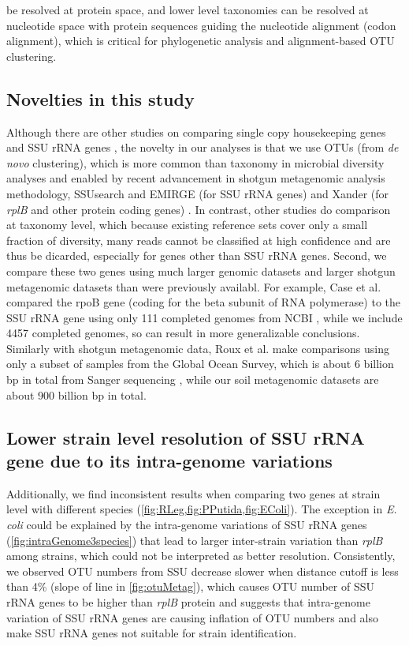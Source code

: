 \documentclass[]{msu-thesis}
\begin{document}
be resolved at protein space, and lower level taxonomies can be resolved at nucleotide space with protein sequences guiding the nucleotide alignment (codon alignment), which is critical for phylogenetic analysis and alignment-based OTU clustering.

\subsection{Novelties in this study}
Although there are other studies on comparing single copy housekeeping genes and SSU rRNA genes \cite{case_use_2007,roux_comparison_2011}, the novelty in our analyses is that we use OTUs (from \textit{de novo} clustering), which is more common than taxonomy in microbial diversity analyses and enabled by recent advancement in shotgun metagenomic analysis methodology, SSUsearch and EMIRGE (for SSU rRNA genes) \cite{guo_microbial_2015,miller_short-read_2013} and Xander (for \textit{rplB} and other protein coding genes) \cite{wang_xander:_2015}. In contrast, other studies do comparison at taxonomy level, which because existing reference sets cover only a small fraction of diversity, many reads cannot be classified at high confidence and are thus be dicarded, especially for genes other than SSU rRNA genes. Second, we compare these two genes using much larger genomic datasets and larger shotgun metagenomic datasets than were previously availabl. For example, Case et al. compared the rpoB gene (coding for the beta subunit of RNA polymerase) to the SSU rRNA gene using only 111 completed genomes from NCBI \cite{case_use_2007}, while we include 4457 completed genomes, so can result in more generalizable conclusions. Similarly with shotgun metagenomic data, Roux et al. make comparisons using only a subset of samples from the Global Ocean Survey, which is about 6 billion bp in total from Sanger sequencing \cite{roux_comparison_2011,rusch_sorcerer_2007}, while our soil metagenomic datasets are about 900 billion bp in total.


\subsection{Lower strain level resolution of SSU rRNA gene due to its intra-genome variations}
Additionally, we find inconsistent results when comparing two genes at strain level with different species (\cref{fig:RLeg,fig:PPutida,fig:EColi}). The exception in \textit{E. coli} could be explained by the intra-genome variations of SSU rRNA genes (\cref{fig:intraGenome3species}) that lead to larger inter-strain variation than \textit{rplB} among strains, which could not be interpreted as better resolution. Consistently, we observed OTU numbers from SSU decrease slower when distance cutoff is less than 4\% (slope of line in \cref{fig:otuMetag}), which causes OTU number of SSU rRNA genes to be higher than \textit{rplB} protein and suggests that intra-genome variation of SSU rRNA genes are causing inflation of OTU numbers \cite{sun_intragenomic_2013} and also make SSU rRNA genes not suitable for strain identification.
\end{document}
